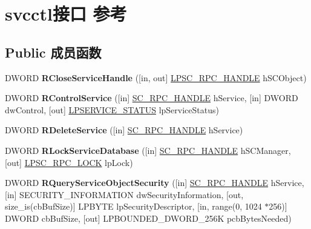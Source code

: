 \hypertarget{interfacesvcctl}{}\section{svcctl接口 参考}
\label{interfacesvcctl}
\subsection*{Public 成员函数}
\begin{DoxyCompactItemize}
\item 
\mbox{\label{interfacesvcctl_a78a0e9eba14f2d8b09d41812121a72c2}} 
D\+W\+O\+RD {\bfseries R\+Close\+Service\+Handle} (\mbox{[}in, out\mbox{]} \hyperlink{interfacevoid}{L\+P\+S\+C\+\_\+\+R\+P\+C\+\_\+\+H\+A\+N\+D\+LE} h\+S\+C\+Object)
\item 
\mbox{\label{interfacesvcctl_ae22042696d329808e90c6c79138e31ac}} 
D\+W\+O\+RD {\bfseries R\+Control\+Service} (\mbox{[}in\mbox{]} \hyperlink{interfacevoid}{S\+C\+\_\+\+R\+P\+C\+\_\+\+H\+A\+N\+D\+LE} h\+Service, \mbox{[}in\mbox{]} D\+W\+O\+RD dw\+Control, \mbox{[}out\mbox{]} \hyperlink{struct___s_e_r_v_i_c_e___s_t_a_t_u_s}{L\+P\+S\+E\+R\+V\+I\+C\+E\+\_\+\+S\+T\+A\+T\+US} lp\+Service\+Status)
\item 
\mbox{\label{interfacesvcctl_ac0e3827cab0a64cf71b8602ed3978983}} 
D\+W\+O\+RD {\bfseries R\+Delete\+Service} (\mbox{[}in\mbox{]} \hyperlink{interfacevoid}{S\+C\+\_\+\+R\+P\+C\+\_\+\+H\+A\+N\+D\+LE} h\+Service)
\item 
\mbox{\label{interfacesvcctl_abf33e1c82e97c0cc9a77c59162419eb7}} 
D\+W\+O\+RD {\bfseries R\+Lock\+Service\+Database} (\mbox{[}in\mbox{]} \hyperlink{interfacevoid}{S\+C\+\_\+\+R\+P\+C\+\_\+\+H\+A\+N\+D\+LE} h\+S\+C\+Manager, \mbox{[}out\mbox{]} \hyperlink{interfacevoid}{L\+P\+S\+C\+\_\+\+R\+P\+C\+\_\+\+L\+O\+CK} lp\+Lock)
\item 
\mbox{\label{interfacesvcctl_a8024ca6d23a3a30fc0a6f45b420d99d7}} 
D\+W\+O\+RD {\bfseries R\+Query\+Service\+Object\+Security} (\mbox{[}in\mbox{]} \hyperlink{interfacevoid}{S\+C\+\_\+\+R\+P\+C\+\_\+\+H\+A\+N\+D\+LE} h\+Service, \mbox{[}in\mbox{]} S\+E\+C\+U\+R\+I\+T\+Y\+\_\+\+I\+N\+F\+O\+R\+M\+A\+T\+I\+ON dw\+Security\+Information, \mbox{[}out, size\+\_\+is(cb\+Buf\+Size)\mbox{]} L\+P\+B\+Y\+TE lp\+Security\+Descriptor, \mbox{[}in, range(0, 1024 $\ast$256)\mbox{]} D\+W\+O\+RD cb\+Buf\+Size, \mbox{[}out\mbox{]} L\+P\+B\+O\+U\+N\+D\+E\+D\+\_\+\+D\+W\+O\+R\+D\+\_\+256K pcb\+Bytes\+Needed)

\end{DoxyCompactItemize}
